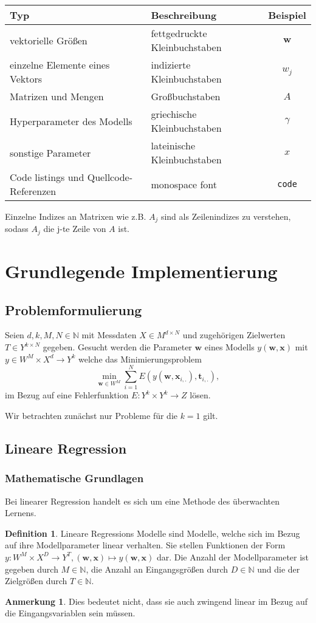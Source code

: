 \documentclass{article}
\theoremstyle{plain} %
\theoremstyle{definition} %
\newtheorem{definition}[theorem]{Definition}
\newtheorem{anno}[theorem]{Anmerkung}
\begin{document}
\begin{tabular}{llc}
  \toprule
  Typ & Beschreibung & Beispiel \\
  \midrule
  vektorielle Größen & fettgedruckte Kleinbuchstaben & $\mathbf{w}$ \\
  einzelne Elemente eines Vektors & indizierte Kleinbuchstaben & $w_j$ \\
  Matrizen und Mengen & Großbuchstaben & $A$ \\
  Hyperparameter des Modells & griechische Kleinbuchstaben & $\gamma$ \\
  sonstige Parameter & lateinische Kleinbuchstaben & $x$ \\
  Code listings und Quellcode-Referenzen & monospace font & \texttt{code} \\
\end{tabular}

Einzelne Indizes an Matrixen wie z.B. $A_j$ sind als Zeilenindizes zu verstehen, sodass $A_j$ die j-te Zeile von $A$ ist.

\section{Grundlegende Implementierung}
\subsection{Problemformulierung}
Seien $d,k,M,N \in \mathbb{N}$ mit Messdaten $X \in M^{d \times N}$ und zugehörigen Zielwerten $T \in Y^{k \times N}$ gegeben. Gesucht werden die Parameter $\mathbf{w}$ eines Modells $y(\mathbf{w}, \mathbf{x})$ mit $y \in W^M \times X^d \rightarrow Y^{k}$ welche das Minimierungsproblem
$$
    \min_{\mathbf{w} \in W^M}\sum_{i=1}^N E(y(\mathbf{w}, \mathbf{x}_{i,.}), \mathbf{t}_{i,.}),
$$
im Bezug auf eine Fehlerfunktion $E: Y^k \times Y^k \rightarrow Z$ lösen.

Wir betrachten zunächst nur Probleme für die $k=1$ gilt.

\subsection{Lineare Regression}
\subsubsection{Mathematische Grundlagen}
Bei linearer Regression handelt es sich um eine Methode des überwachten Lernens.
\begin{definition}
  Lineare Regressions Modelle sind Modelle, welche sich im Bezug auf ihre Modellparameter linear verhalten\cite[S. 137f]{Bishop}. Sie stellen Funktionen der Form $y: W^M \times X^D \rightarrow Y^T, (\mathbf{w}, \mathbf{x}) \mapsto y(\mathbf{w}, \mathbf{x})$ dar. Die Anzahl der Modellparameter ist gegeben durch $M \in \mathbb{N}$, die Anzahl an Eingangsgrößen durch $D \in \mathbb{N}$ und die der Zielgrößen durch $T \in \mathbb{N}$.
\end{definition}
\begin{anno}
  Dies bedeutet nicht, dass sie auch zwingend linear im Bezug auf die Eingangsvariablen sein müssen.
\end{anno}
\end{document}
